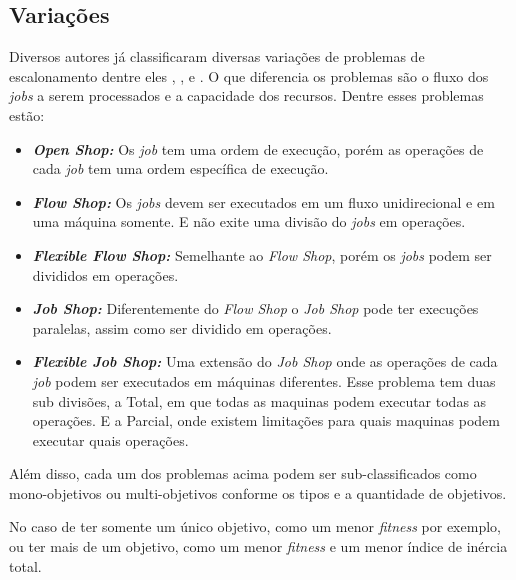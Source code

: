     \subsection{Variações}
        Diversos autores já classificaram diversas variações de problemas de escalonamento dentre eles \cite{graham1979}, \cite{Lenstra1979}, e \cite{maccarthy1993}. O que diferencia os problemas são o fluxo dos \textit{jobs} a serem processados e a capacidade dos recursos. Dentre esses problemas estão:
        \begin{itemize}
            \item \textbf{\textit{Open Shop:}} Os \textit{job} tem uma ordem de execução, porém as operações de cada \textit{job} tem uma ordem específica de execução.
            
            \item \textbf{\textit{Flow Shop:}} Os \textit{jobs} devem ser executados em um fluxo unidirecional e em uma máquina somente. E não exite uma divisão do \textit{jobs} em operações.
            
            \item \textbf{\textit{Flexible Flow Shop:}} Semelhante ao \textit{Flow Shop}, porém os \textit{jobs} podem ser divididos em operações.
            
            \item \textbf{\textit{Job Shop:}} Diferentemente do \textit{Flow Shop} o \textit{Job Shop} pode ter execuções paralelas, assim como ser dividido em operações.
            
            \item \textbf{\textit{Flexible Job Shop:}} Uma extensão do \textit{Job Shop} onde as operações de cada \textit{job} podem ser executados em máquinas diferentes. Esse problema tem duas sub divisões, a Total, em que todas as maquinas podem executar todas as operações. E a Parcial, onde existem limitações para quais maquinas podem executar quais operações.
        \end{itemize}

        Além disso, cada um dos problemas acima podem ser sub-classificados como mono-objetivos ou multi-objetivos conforme os tipos e a quantidade de objetivos.\newline

        No caso de ter somente um único objetivo, como um menor \textit{fitness} por exemplo, ou ter mais de um objetivo, como um menor \textit{fitness} e um menor índice de inércia total.\newline

